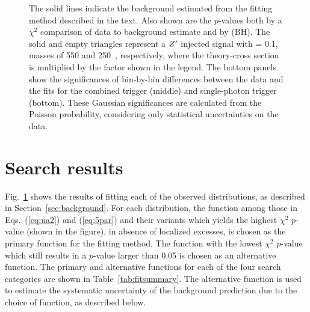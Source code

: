 \begin{figure}
{  The solid lines indicate the background estimated from the fitting method described in the text.
    Also shown are 
    the $p$-values  both by a $\chi^2$ comparison of data to background estimate and by \BumpHunter (BH). 
    The solid and empty triangles represent a $Z^{\prime}$ injected signal with \gq = 0.1, masses of 550 and 250~\GeV, respectively, where the theory-cross section is multiplied by the factor shown in the legend.
    The bottom panels show the significances of bin-by-bin differences between the data and the fits for the combined trigger (middle) and single-photon trigger (bottom).
    These Gaussian significances are calculated from the Poisson probability, considering only statistical uncertainties on the data.
  }
  \label{fig:data}
\end{figure}


\section{Search results}
\label{sec:result}

Fig.~\ref{fig:data} shows the results of fitting each of the observed distributions, as described in Section~\ref{sec:background}.
For each distribution, the function among those in Eqs.~(\ref{eq:ua2}) and (\ref{eq:5par}) and their variants which yields the highest $\chi^2$ $p$-value (shown in the figure), in absence of localized excesses, is chosen as the primary function for the fitting method.
The function with the lowest $\chi^2$ $p$-value which still results in a $p$-value larger than 0.05 is chosen as an alternative function.
The primary and alternative functions for each of the four search categories are shown in Table~\ref{tab:fitsummary}.
The alternative function is used to estimate the systematic uncertainty of the background prediction due to the choice of function, as described below.


